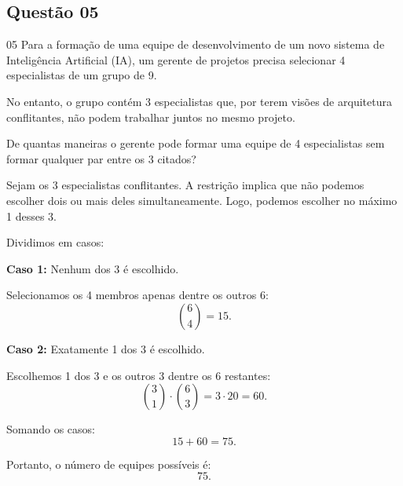\subsection*{Questão 05}

\begin{questionbox}{05}
  Para a formação de uma equipe de desenvolvimento de um novo sistema de Inteligência Artificial (IA), um gerente de projetos precisa selecionar 4 especialistas de um grupo de 9. 

  No entanto, o grupo contém 3 especialistas que, por terem visões de arquitetura conflitantes, não podem trabalhar juntos no mesmo projeto. 

  De quantas maneiras o gerente pode formar uma equipe de 4 especialistas sem formar qualquer par entre os 3 citados?
\end{questionbox}

\begin{solutionbox}
  Sejam os 3 especialistas conflitantes. A restrição implica que não podemos escolher dois ou mais deles simultaneamente. Logo, podemos escolher no máximo 1 desses 3.

  Dividimos em casos:

  \textbf{Caso 1:} Nenhum dos 3 é escolhido.

  Selecionamos os 4 membros apenas dentre os outros 6:
  \[
  \binom{6}{4} = 15.
  \]

  \textbf{Caso 2:} Exatamente 1 dos 3 é escolhido.

  Escolhemos 1 dos 3 e os outros 3 dentre os 6 restantes:
  \[
  \binom{3}{1} \cdot \binom{6}{3} = 3 \cdot 20 = 60.
  \]
\end{solutionbox}

\newpage

\begin{solutionbox}
  Somando os casos:
  \[
  15 + 60 = 75.
  \]

  Portanto, o número de equipes possíveis é:
  \[
  \boxed{75}.
  \]
\end{solutionbox}
